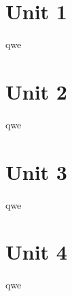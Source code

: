 \documentclass[11pt,a4paper]{article}
\begin{document}
\section{Unit 1}
qwe



\section{Unit 2}
qwe



\section{Unit 3}
qwe



\section{Unit 4}
qwe
\end{document}
